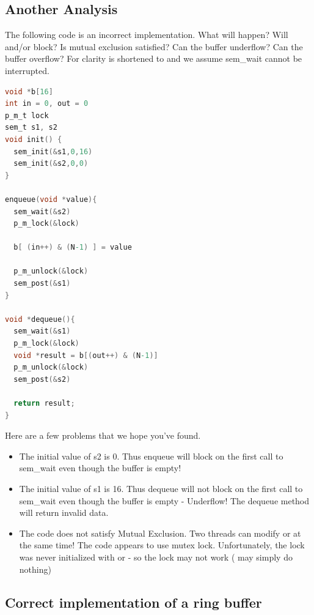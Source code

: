 \subsection{Another Analysis}

The following code is an incorrect implementation.
What will happen?
Will  and/or  block?
Is mutual exclusion satisfied?
Can the buffer underflow?
Can the buffer overflow?
For clarity  is shortened to  and we assume sem\_wait cannot be interrupted.

\begin{lstlisting}[language=C]
void *b[16]
int in = 0, out = 0
p_m_t lock
sem_t s1, s2
void init() {
  sem_init(&s1,0,16)
  sem_init(&s2,0,0)
}

enqueue(void *value){
  sem_wait(&s2)
  p_m_lock(&lock)

  b[ (in++) & (N-1) ] = value

  p_m_unlock(&lock)
  sem_post(&s1)
}

void *dequeue(){
  sem_wait(&s1)
  p_m_lock(&lock)
  void *result = b[(out++) & (N-1)]
  p_m_unlock(&lock)
  sem_post(&s2)

  return result;
}
\end{lstlisting}

Here are a few problems that we hope you've found.

\begin{itemize}
\tightlist
\item
  The initial value of s2 is 0.
  Thus enqueue will block on the first call to sem\_wait even though the buffer is empty!
\item
  The initial value of s1 is 16.
  Thus dequeue will not block on the first call to sem\_wait even though the buffer is empty - Underflow!
  The dequeue method will return invalid data.
\item
  The code does not satisfy Mutual Exclusion.
  Two threads can modify  or  at the same time!
  The code appears to use mutex lock. Unfortunately, the lock was never initialized with  or  - so the lock may not work ( may simply do nothing)
\end{itemize}

\subsection{Correct implementation of a ring buffer}

